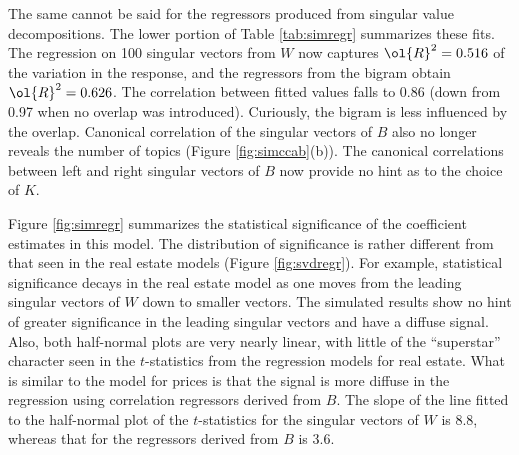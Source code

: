 \documentclass[12pt]{article}
\begin{document}
 
 The same cannot be said for the regressors produced from singular value decompositions.  The lower portion of Table \ref{tab:simregr} summarizes these fits.  The regression on 100 singular vectors from $W$ now captures $\ol{R}^2 = 0.516$ of the variation in the response, and the regressors from the bigram obtain $\ol{R}^2 = 0.626$.  The correlation between fitted values falls to 0.86 (down from 0.97 when no overlap was introduced).  Curiously, the bigram is less influenced by the overlap.  
 Canonical correlation of the singular vectors of $B$ also no longer reveals the number of topics (Figure \ref{fig:simccab}(b)).   The canonical correlations between left and right singular vectors of $B$ now provide no hint as to the choice of $K$.  
 
 
 Figure \ref{fig:simregr} summarizes the statistical significance of the coefficient estimates in this model.  The distribution of significance is rather different from that seen in the real estate models (Figure \ref{fig:svdregr}).  For example, statistical significance decays in the real estate model as one moves from the leading singular vectors of $W$ down to smaller vectors.  The simulated results show no hint of greater significance in the leading singular vectors and have a diffuse signal.
  Also, both half-normal plots are very nearly linear, with little of the ``superstar'' character seen in the $t$-statistics from the regression models for real estate.  What is similar to the model for prices is that the signal is more diffuse in the regression using correlation regressors derived from $B$.  The slope of the line fitted to the half-normal plot of the $t$-statistics for the singular vectors of $W$ is 8.8, whereas that for the regressors derived from $B$ is 3.6.  
 
\end{document}
